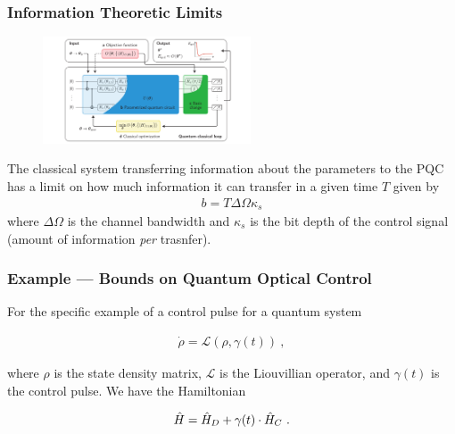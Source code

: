 
\begin{frame}
    \frametitle{Information Theoretic Limits}

    
    \begin{multicols}{2}
        \begin{figure}
            \includegraphics[width=0.55\textwidth]{figures/vqaarch.pdf}
        \end{figure}
        The classical system transferring information about the parameters to
        the PQC has a limit on how much information it can transfer in a given
        time \(T\) given by
        \begin{gather*}
            b = T\Delta\Omega\kappa_s
        \end{gather*}
        where \(\Delta\Omega\) is the channel bandwidth and \(\kappa_s\) is the
        bit depth of the control signal (amount of information \emph{per}
        trasnfer).
    \end{multicols}

\end{frame}

\begin{frame}
    \frametitle{Example --- Bounds on Quantum Optical Control}

    For the specific example of a control pulse for a quantum system

    \begin{gather*}
        \dot{\rho} = \mathcal{L}(\rho, \gamma(t))~,
    \end{gather*}

    where \(\rho\) is the state density matrix, \(\mathcal{L}\) is the
    Liouvillian operator, and \(\gamma(t)\) is the control pulse. We have the
    Hamiltonian

    \begin{gather*}
        \hat{H} = \hat{H}_D + \gamma(t)\cdot \hat{H}_C~.
    \end{gather*}

\end{frame}

